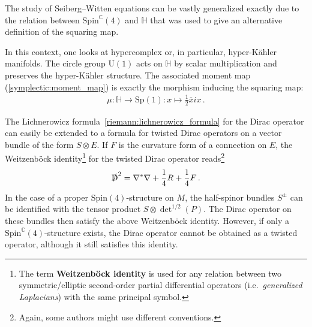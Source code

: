     \begin{remark}
        The study of Seiberg--Witten equations can be vastly generalized exactly due to the relation between $\mathrm{Spin}^{\mathbb{C}}(4)$ and $\mathbb{H}$ that was used to give an alternative definition of the squaring map.

        In this context, one looks at hypercomplex or, in particular, hyper-K\"ahler manifolds. The circle group $\mathrm{U}(1)$ acts on $\mathbb{H}$ by scalar multiplication and preserves the hyper-K\"ahler structure. The associated moment map (\cref{symplectic:moment_map}) is exactly the morphism inducing the squaring map:
        \begin{gather}
            \mu:\mathbb{H}\rightarrow\mathrm{Sp}(1):x\mapsto\frac{1}{2}\overline{x}ix\,.
        \end{gather}
    \end{remark}

    \begin{property}
        The Lichnerowicz formula~\ref{riemann:lichnerowicz_formula} for the Dirac operator can easily be extended to a formula for twisted Dirac operators on a vector bundle of the form $S\otimes E$. If $F$ is the curvature form of a connection on $E$, the Weitzenb\"ock identity\footnote{The term \textbf{Weitzenb\"ock identity} is used for any relation between two symmetric/elliptic second-order partial differential operators (i.e.~\textit{generalized Laplacians}) with the same principal symbol.} for the twisted Dirac operator reads\footnote{Again, some authors might use different conventions.}
        \begin{gather}
            \slashed{\mathrm{D}}^2 = \nabla^*\nabla+\frac{1}{4}R+\frac{1}{4}F\,.
        \end{gather}
        In the case of a proper $\mathrm{Spin}(4)$-structure on $M$, the half-spinor bundles $S^\pm$ can be identified with the tensor product $S\otimes\det^{1/2}(P)$. The Dirac operator on these bundles then satisfy the above Weitzenb\"ock identity. However, if only a $\mathrm{Spin}^{\mathbb{C}}(4)$-structure exists, the Dirac operator cannot be obtained as a twisted operator, although it still satisfies this identity.
    \end{property}

